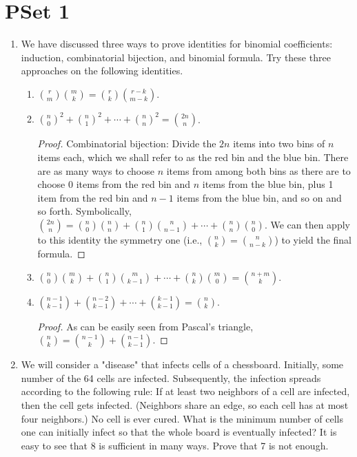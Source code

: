 \documentclass[../apprentice.tex]{subfiles}
\begin{document}
\section{PSet 1}
\begin{enumerate}
    \item We have discussed three ways to prove identities for binomial coefficients: induction, combinatorial bijection, and binomial formula. Try these three approaches on the following identities.
    \begin{enumerate}
        \item $\binom{r}{m}\binom{m}{k}=\binom{r}{k}\binom{r-k}{m-k}$.
        \item $\binom{n}{0}^2+\binom{n}{1}^2+\cdots+\binom{n}{n}^2=\binom{2n}{n}$.
        \begin{proof}
            Combinatorial bijection: Divide the $2n$ items into two bins of $n$ items each, which we shall refer to as the red bin and the blue bin. There are as many ways to choose $n$ items from among both bins as there are to choose 0 items from the red bin and $n$ items from the blue bin, plus 1 item from the red bin and $n-1$ items from the blue bin, and so on and so forth. Symbolically, $\binom{2n}{n}=\binom{n}{0}\binom{n}{n}+\binom{n}{1}\binom{n}{n-1}+\cdots+\binom{n}{n}\binom{n}{0}$. We can then apply to this identity the symmetry one (i.e., $\binom{n}{k}=\binom{n}{n-k}$) to yield the final formula.
        \end{proof}
        \item $\binom{n}{0}\binom{m}{k}+\binom{n}{1}\binom{m}{k-1}+\cdots+\binom{n}{k}\binom{m}{0}=\binom{n+m}{k}$.
        \item $\binom{n-1}{k-1}+\binom{n-2}{k-1}+\cdots+\binom{k-1}{k-1}=\binom{n}{k}$.
        \begin{proof}
            As can be easily seen from Pascal's triangle, $\binom{n}{k}=\binom{n-1}{k}+\binom{n-1}{k-1}$.
        \end{proof}
    \end{enumerate}
    \item We will consider a "disease" that infects cells of a chessboard. Initially, some number of the 64 cells are infected. Subsequently, the infection spreads according to the following rule: If at least two neighbors of a cell are infected, then the cell gets infected. (Neighbors share an edge, so each cell has at most four neighbors.) No cell is ever cured. What is the minimum number of cells one can initially infect so that the whole board is eventually infected? It is easy to see that 8 is sufficient in many ways. Prove that 7 is not enough.

\end{enumerate}
\end{document}
